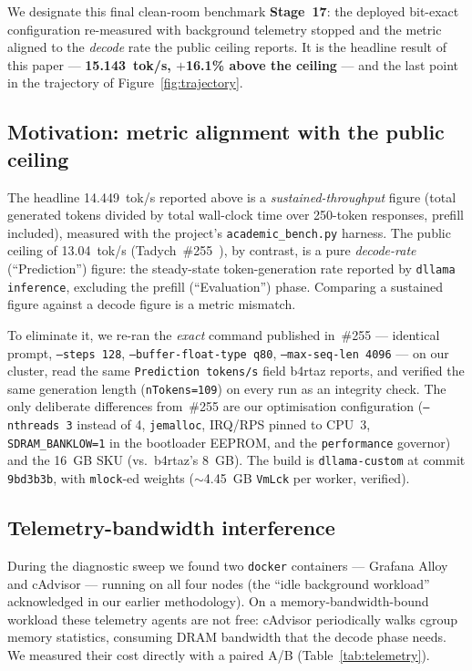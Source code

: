 \documentclass[10pt,a4paper]{article}
\begin{document}
We designate this final clean-room benchmark \textbf{Stage~17}: the deployed bit-exact configuration re-measured with background telemetry stopped and the metric aligned to the \emph{decode} rate the public ceiling reports. It is the headline result of this paper --- \textbf{15.143~tok/s, $+$16.1\% above the ceiling} --- and the last point in the trajectory of Figure~\ref{fig:trajectory}.

\subsection{Motivation: metric alignment with the public ceiling}
The headline 14.449~tok/s reported above is a \emph{sustained-throughput} figure (total generated tokens divided by total wall-clock time over 250-token responses, prefill included), measured with the project's \texttt{academic\_bench.py} harness. The public ceiling of 13.04~tok/s (Tadych~\#255~\cite{dllama_discussion255}), by contrast, is a pure \emph{decode-rate} (``Prediction'') figure: the steady-state token-generation rate reported by \texttt{dllama inference}, excluding the prefill (``Evaluation'') phase. Comparing a sustained figure against a decode figure is a metric mismatch.

To eliminate it, we re-ran the \emph{exact} command published in~\#255 --- identical prompt, \texttt{--steps 128}, \texttt{--buffer-float-type q80}, \texttt{--max-seq-len 4096} --- on our cluster, read the same \texttt{Prediction tokens/s} field b4rtaz reports, and verified the same generation length (\texttt{nTokens=109}) on every run as an integrity check. The only deliberate differences from~\#255 are our optimisation configuration (\texttt{--nthreads 3} instead of 4, \texttt{jemalloc}, IRQ/RPS pinned to CPU~3, \texttt{SDRAM\_BANKLOW=1} in the bootloader EEPROM, and the \texttt{performance} governor) and the 16~GB SKU (vs.\ b4rtaz's 8~GB). The build is \texttt{dllama-custom} at commit \texttt{9bd3b3b}, with \texttt{mlock}-ed weights ($\sim$4.45~GB \texttt{VmLck} per worker, verified).

\subsection{Telemetry-bandwidth interference}
During the diagnostic sweep we found two \texttt{docker} containers --- Grafana Alloy and cAdvisor --- running on all four nodes (the ``idle background workload'' acknowledged in our earlier methodology). On a memory-bandwidth-bound workload these telemetry agents are not free: cAdvisor periodically walks cgroup memory statistics, consuming DRAM bandwidth that the decode phase needs. We measured their cost directly with a paired A/B (Table~\ref{tab:telemetry}).
\end{document}
